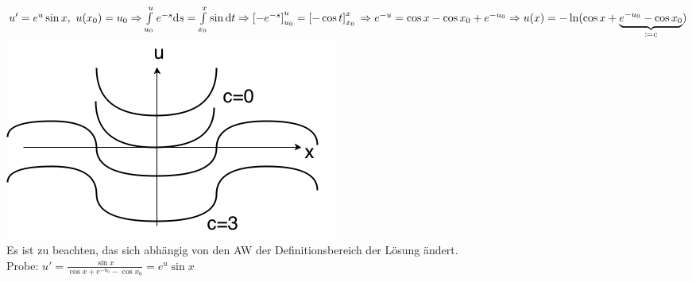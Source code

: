\begin{enumerate}
        \begin{beispiel*}
        $u' = e^u \sin x, \ u(x_0) = u_0 \\
        \Rightarrow \int\limits_{u_0}^u e^{-s} \mathrm{d}s
        = \int\limits_{x_0}^x \sin \mathrm{d}t
        \Rightarrow \left[ -e^{-s} \right]_{u_0}^u = \left[ - \cos t \right]_{x_0}^x \\
        \Rightarrow e^{-u} = \cos x - \cos x_0 + e^{-u_0}
        \Rightarrow u(x) = -\ln ( \cos x 
        + \underbrace{e^{-u_0} - \cos x_0}_{\coloneqq c})\\
        $        
        \includegraphics[scale=0.5]{pictures/011-07.png}\\                            
        Es ist zu beachten, das sich abhängig von den AW der Definitionsbereich der
        Lösung ändert.\\
        Probe: $u' = 
        \frac{
        \sin x}
        {\cos x + e^{-u_0} - \cos x_0}
        = e^u \sin x
        $
        \end{beispiel*}        
\end{enumerate}

